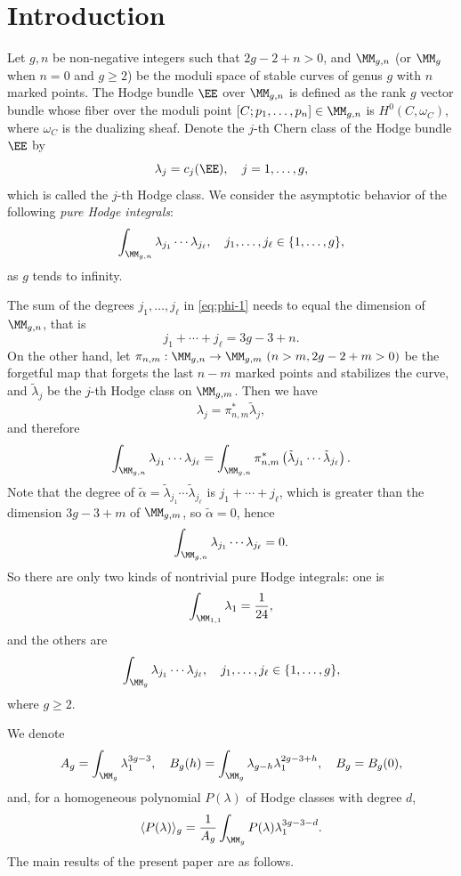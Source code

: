 \section{Introduction}
\label{sec:introduction}
Let $g, n$ be non-negative integers such that $2g-2+n>0$, and $\MM_{g,n}$ (or $\MM_g$ when $n=0$
and $g \ge 2$) be the moduli space of stable curves of genus $g$ with $n$ marked points. The Hodge
bundle $\EE$ over $\MM_{g,n}$ is defined as the rank $g$ vector bundle whose fiber over the moduli
point $[C; p_1, \dots, p_n] \in \MM_{g,n}$ is $H^0(C,\omega_C)$, where $\omega_C$ is the dualizing sheaf.
Denote the $j$-th Chern class of the Hodge bundle $\EE$ by
\[\lambda_j=c_j(\EE),\quad j=1,\dots, g,\]
which is called the $j$-th Hodge class.
We consider the asymptotic behavior of the following \emph{pure Hodge integrals}:
\begin{equation}
\int_{\MM_{g,n}}\lambda_{j_1}\cdots \lambda_{j_\ell},\quad j_1, \dots, j_\ell \in \{1, \dots, g\},
\label{eq:phi-1}
\end{equation}
as $g$ tends to infinity.

The sum of the degrees $j_1, \dots, j_\ell$ in \eqref{eq:phi-1} needs to equal the dimension of $\MM_{g,n}$,
that is
\[j_1+\cdots+j_\ell=3g-3+n.\]
On the other hand, let $\pi_{n,m}:\MM_{g,n}\to \MM_{g,m}\ (n > m, 2g-2+m>0)$ be the forgetful map that forgets the
last $n-m$ marked points and stabilizes the curve, and $\tilde{\lambda}_j$ be the $j$-th Hodge class on $\MM_{g,m}$. Then we have
\[\lambda_j=\pi_{n,m}^*\tilde{\lambda}_j,\]
and therefore
\[\int_{\MM_{g,n}}\lambda_{j_1}\cdots \lambda_{j_\ell}
=\int_{\MM_{g,n}}\pi_{n,m}^*\left(\tilde{\lambda}_{j_1}\cdots \tilde{\lambda}_{j_\ell}\right).\]
Note that the degree of $\tilde{\alpha}=\tilde{\lambda}_{j_1}\cdots \tilde{\lambda}_{j_\ell}$
is $j_1+\cdots+j_\ell$, which is greater than the dimension $3g-3+m$ of $\MM_{g,m}$, so
$\tilde{\alpha}=0$, hence
\[\int_{\MM_{g,n}}\lambda_{j_1}\cdots \lambda_{j_\ell}=0.\]
So there are only two kinds of nontrivial pure Hodge integrals:
one is
\[\int_{\MM_{1,1}}\lambda_1=\frac{1}{24},\]
and the others are
\begin{equation}
\int_{\MM_g}\lambda_{j_1}\cdots \lambda_{j_\ell},
\quad j_1, \dots, j_\ell \in \{1, \dots, g\},
\label{eq:phi-2}
\end{equation}
where $g\ge 2$.

We denote
\[A_g=\int_{\MM_g}\lambda_1^{3g-3},\quad B_g(h)=\int_{\MM_g}\lambda_{g-h} \lambda_1^{2g-3+h},
\quad B_g=B_g(0),\]
and, for a homogeneous polynomial $P(\lambda)$ of Hodge classes with degree $d$,
\[\langle P(\lambda) \rangle_g=\frac{1}{A_g}\int_{\MM_g} P(\lambda)\lambda_1^{3g-3-d}.\]
The main results of the present paper are as follows.

